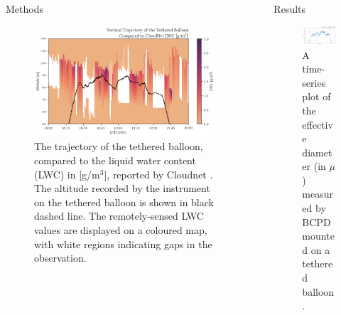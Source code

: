 \documentclass[final]{beamer}
\newlength{\sepwidth}
\newlength{\colwidth}
\newcommand{\separatorcolumn}{\begin{column}{\sepwidth}\end{column}}
\begin{document}
\begin{frame}[t]
\begin{columns}[t]
\begin{column}{\colwidth}
\begin{block}{Methods}
        \begin{figure}
          \centering
          \includegraphics[width=\colwidth]{figure/ts_alt.png}
          \caption{The trajectory of the tethered balloon, compared to the liquid water content (LWC) in [g/m$^3$], reported by Cloudnet \cite{illingworth2007cloudnet}. The altitude recorded by the instrument on the tethered balloon is shown in black dashed line. The remotely-sensed LWC values are displayed on a coloured map, with white regions indicating gaps in the observation.}
          \label{fig:02}
        \end{figure}
      \end{block}
    \end{column}

    \separatorcolumn
    \begin{column}{\colwidth}

      \begin{block}{Results}
        \begin{figure}
          \centering
          \includegraphics[width=\colwidth]{figure/ts_ed.png}
          \caption{A time-series plot of the effective diameter (in $\mu$) measured by BCPD mounted on a tethered balloon.}
          \label{fig:03}
        \end{figure}


\end{block}
\end{column}
\end{columns}
\end{frame}
\end{document}
